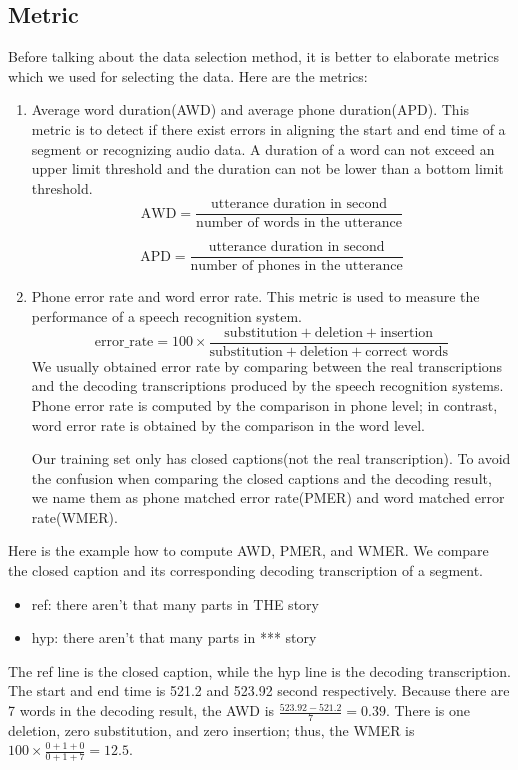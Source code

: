 \subsection{Metric}
Before talking about the data selection method, it is better to elaborate metrics which we used for selecting the data.  Here are the metrics:
\begin{enumerate}
\item Average word duration(AWD) and average phone duration(APD). This metric is to detect if there exist errors in aligning the start and end time of a segment or recognizing audio data. A duration of a word can not exceed an upper limit threshold and the duration can not be lower than a bottom limit threshold.  
\begin{equation}
\textrm{AWD} = \frac{\textrm{utterance duration in second}}{\textrm{number of words in the utterance}}
\end{equation}

\begin{equation}
\textrm{APD} = \frac{\textrm{utterance duration in second}} {\textrm{number of phones in the utterance}}
\end{equation}

\item Phone error rate and word error rate. This metric is used to measure the performance of a speech recognition system.
\begin{equation}
\textrm{error\_rate} = 100 \times \frac{\textrm{substitution} + \textrm{deletion} + \textrm{insertion}}{\textrm{substitution} + \textrm{deletion} +  \textrm{correct words}}
\end{equation}
We usually obtained error rate by comparing between the real transcriptions and the decoding transcriptions produced by the speech recognition systems. Phone error rate is computed by the comparison in phone level; in contrast, word error rate is obtained by the comparison in the word level.

Our training set only has  closed captions(not the real transcription). To avoid the confusion when comparing the closed captions and the decoding result, we name them as phone matched error rate(PMER) and word matched error rate(WMER).
\end{enumerate}

Here is the example how to compute AWD, PMER, and WMER. We compare the closed caption and its corresponding decoding transcription of a segment.
\begin{itemize}
\item ref:  there   aren't  that    many    parts   in      THE     story      
\item  hyp: there   aren't  that    many    parts   in      ***     story
\end{itemize}
The ref line is the closed caption, while the hyp line is the decoding transcription. The start and end time is 521.2 and 523.92 second respectively. Because there are 7 words in the decoding result, the AWD is $\frac{523.92-521.2}{7}=0.39$. There is one deletion, zero substitution, and zero insertion; thus, the WMER is $100 \times \frac{0 + 1 + 0}{0 + 1 + 7}=12.5$.


